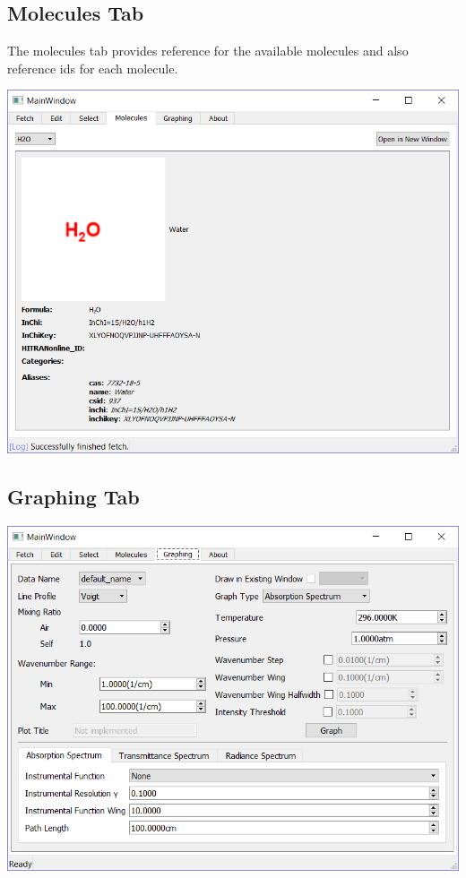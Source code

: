 \documentclass[12pt]{article}
\begin{document}
\subsection{Molecules Tab}
The molecules tab provides reference for the available molecules and also reference ids for each molecule.
\begin{center}
\includegraphics[scale = 0.8]{MainWindow_Molecules}
\end{center}

\subsection{Graphing Tab}
\begin{center}
\includegraphics[scale = 0.8]{MainWindow_Graphing}
\end{center}
\end{document}
